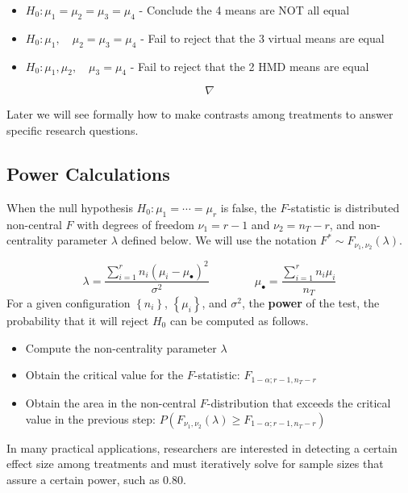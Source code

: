 \documentclass[
]{book}
\providecommand{\tightlist}{%
  \setlength{\itemsep}{0pt}\setlength{\parskip}{0pt}}
\begin{document}
\begin{itemize}
\tightlist
\item
  \(H_0:\mu_1=\mu_2=\mu_3=\mu_4\) - Conclude the 4 means are NOT all
  equal
\item
  \(H_0:\mu_1,\quad \mu_2=\mu_3=\mu_4\) - Fail to reject that the 3
  virtual means are equal
\item
  \(H_0:\mu_1, \mu_2,\quad  \mu_3=\mu_4\) - Fail to reject that the 2
  HMD means are equal
\end{itemize}

\[\nabla\]

Later we will see formally how to make contrasts among treatments to
answer specific research questions.

\subsection{Power Calculations}\label{power-calculations}

When the null hypothesis \(H_0:\mu_1=\cdots =\mu_r\) is false, the
\(F\)-statistic is distributed non-central \(F\) with degrees of freedom
\(\nu_1=r-1\) and \(\nu_2=n_T-r\), and non-centrality parameter
\(\lambda\) defined below. We will use the notation
\(F^* \sim F_{\nu_1,\nu_2}\left(\lambda\right)\).

\[
\lambda = \frac{\sum_{i=1}^rn_i\left(\mu_i-\mu_{\bullet}\right)^2}{\sigma^2}
\qquad \qquad \mu_{\bullet}=\frac{\sum_{i=1}^rn_i\mu_i}{n_T}
\] For a given configuration \(\left\{n_i\right\}\),
\(\left\{\mu_i\right\}\), and \(\sigma^2\), the \textbf{power} of the
test, the probability that it will reject \(H_0\) can be computed as
follows.

\begin{itemize}
\tightlist
\item
  Compute the non-centrality parameter \(\lambda\)
\item
  Obtain the critical value for the \(F\)-statistic:
  \(F_{1-\alpha;r-1,n_T-r}\)
\item
  Obtain the area in the non-central \(F\)-distribution that exceeds the
  critical value in the previous step:
  \(P\left(F_{\nu_1,\nu_2}\left(\lambda\right) \ge F_{1-\alpha;r-1,n_T-r} \right)\)
\end{itemize}

In many practical applications, researchers are interested in detecting
a certain effect size among treatments and must iteratively solve for
sample sizes that assure a certain power, such as 0.80.
\end{document}
